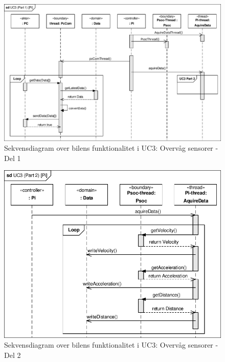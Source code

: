 \begin{landscape}

\begin{figure}[h]
\centering
\includegraphics[]{../fig/diagrammer/bil/sd_uc3_1.pdf}
\caption{Sekvensdiagram over  bilens funktionalitet i UC3: Overvåg sensorer - Del 1}
\label{fig:sd_uc3_1_bil}
\end{figure}

\end{landscape}

\begin{figure}[h]
\centering
\includegraphics[]{../fig/diagrammer/bil/sd_uc3_2.pdf}
\caption{Sekvensdiagram over  bilens funktionalitet i UC3: Overvåg sensorer - Del 2}
\label{fig:sd_uc3_2_bil}
\end{figure}

